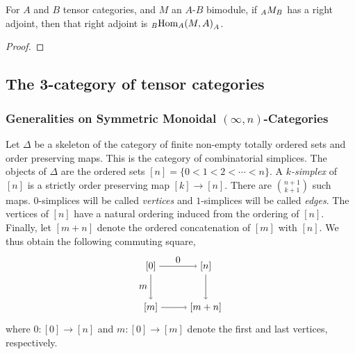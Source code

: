 \documentclass{amsart}
\begin{document}
\begin{corollary}
For $A$ and $B$ tensor categories, and $M$ an $A$-$B$ bimodule, if ${}_{A} {M}_{B}$ has a right adjoint, then that right adjoint is ${}_{B} {\operatorname{Hom}_A(M,A)}_{A}$.
\end{corollary}

\begin{proof}
\end{proof}



\subsection{The 3-category of tensor categories} \label{sec-tc-threecat}

\subsubsection*{Generalities on Symmetric Monoidal $(\infty, n)$-Categories}

Let $\Delta$ be a skeleton of the category of finite non-empty totally ordered sets and order preserving maps. This is the category of combinatorial simplices. The objects of $\Delta$ are the ordered sets $[n] = \{ 0 < 1 < 2 < \cdots < n\}$. A {\em $k$-simplex} of $[n]$ is a strictly order preserving map $[k] \to [n]$. There are $ {n+1}\choose {k+1}$ such maps. $0$-simplices will be called {\em vertices} and $1$-simplices will be called {\em edges}. The vertices of $[n]$ have a natural ordering induced from the ordering of $[n]$. Finally, let $[m + n]$ denote the ordered concatenation of $[m]$ with $[n]$. We thus obtain the following commuting square,
\begin{equation} \label{Eqn:Segal-Co-Map}
\begin{tikzpicture}[baseline = 0.75cm]
	\node (LT) at (0, 1.5) {$[0]$};
	\node (LB) at (0, 0) {$[m]$};
	\node (RT) at (2, 1.5) {$[n]$};
	\node (RB) at (2, 0) {$[m+n]$};
	\draw [->] (LT) -- node [left] {$m$} (LB);
	\draw [->] (LT) -- node [above] {$0$} (RT);
	\draw [->] (RT) -- node [right] {$$} (RB);
	\draw [->] (LB) -- node [below] {$$} (RB);
\end{tikzpicture}
\end{equation}
where $0: [0] \to [n]$ and $m: [0] \to [m]$ denote the first and last vertices, respectively. 
\end{document}
